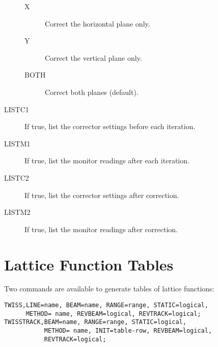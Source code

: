 \begin{description}
  \begin{description}
  \item[X]
    Correct the horizontal plane only.
  \item[Y]
    Correct the vertical plane only.
  \item[BOTH]
    Correct both planes (default).
  \end{description}
\item[LISTC1]
  If true, list the corrector settings before each iteration.
\item[LISTM1]
  If true, list the monitor readings after each iteration.
\item[LISTC2]
  If true, list the corrector settings after correction.
\item[LISTM2]
  If true, list the monitor readings after correction.
\end{description}

\section{Lattice Function Tables}
\label{sec:twiss}

Two commands are available to generate tables of lattice functions:
\begin{verbatim}
TWISS,LINE=name, BEAM=name, RANGE=range, STATIC=logical,
      METHOD= name, REVBEAM=logical, REVTRACK=logical;
TWISSTRACK,BEAM=name, RANGE=range, STATIC=logical, 
           METHOD= name, INIT=table-row, REVBEAM=logical,
           REVTRACK=logical;
\end{verbatim}

